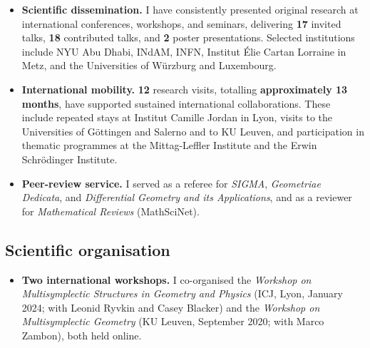 \documentclass[a4paper,fontsize=11bp]{scrartcl}
\newenvironment{refsection}{\begingroup}{\endgroup}
\begin{document}
\begin{refsection}
\begin{itemize}
\setlength{\itemsep}{0.15\baselineskip}
\setlength{\parsep}{0pt}
%
\item \textbf{Scientific dissemination.} I have consistently presented original research at international conferences, workshops, and seminars, delivering \textbf{17} invited talks, \textbf{18} contributed talks, and \textbf{2} poster presentations. Selected institutions include NYU Abu Dhabi, INdAM, INFN, Institut \'Elie Cartan Lorraine in Metz, and the Universities of W\"urzburg and Luxembourg.

\item \textbf{International mobility.} \textbf{12} research visits, totalling \textbf{approximately 13 months}, have supported sustained international collaborations. These include repeated stays at Institut Camille Jordan in Lyon, visits to the Universities of G\"ottingen and Salerno and to KU Leuven, and participation in thematic programmes at the Mittag-Leffler Institute and the Erwin Schr\"odinger Institute.


\item \textbf{Peer-review service.} I served as a referee for \emph{SIGMA}, \emph{Geometriae Dedicata}, and \emph{Differential Geometry and its Applications}, and as a reviewer for \emph{Mathematical Reviews} (MathSciNet).

\end{itemize}

\subsection*{Scientific organisation}

\begin{itemize}
\setlength{\itemsep}{0.1\baselineskip}
\setlength{\parsep}{0pt}
\item \textbf{Two international workshops.} I co-organised the
\emph{Workshop on Multisymplectic Structures in Geometry and Physics}
(ICJ, Lyon, January 2024; with Leonid Ryvkin and Casey Blacker) and the
\emph{Workshop on Multisymplectic Geometry}
(KU Leuven, September 2020; with Marco Zambon), both held online.


\end{itemize}
\end{refsection}
\end{document}
